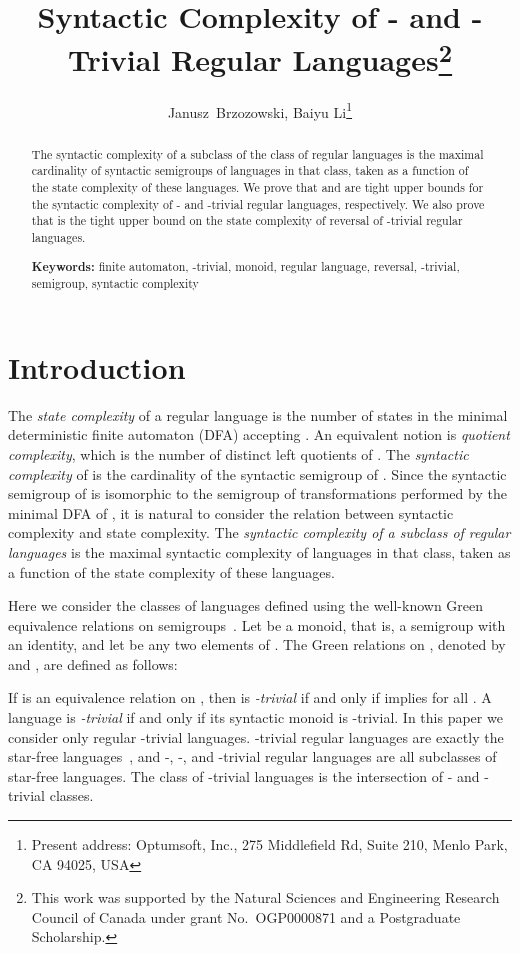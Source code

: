 \documentclass{llncs}
\title{Syntactic Complexity of - and -Trivial Regular Languages\thanks{This work was supported by the Natural Sciences and Engineering Research Council of Canada under grant No.~OGP0000871 and  a Postgraduate Scholarship.
}
}
\author{Janusz~Brzozowski, Baiyu Li\thanks{Present address: 
Optumsoft, Inc.,
275 Middlefield Rd, Suite 210, Menlo Park, CA 94025, USA}
}
\institute{David R. Cheriton School of Computer Science, University of Waterloo \\
Waterloo, ON, Canada N2L 3G1\\
\{{\tt \{brzozo, b5li\}@uwaterloo.ca} \}
}
\newcommand{\noin}{\noindent}
\begin{document}
\maketitle
\begin{abstract}
The syntactic complexity of a subclass of the class of regular languages is the maximal cardinality of syntactic semigroups of languages in that class, taken as a function of the state complexity  of these languages.
We prove that  and  are tight upper bounds for 
the syntactic complexity of - and -trivial regular languages, respectively. 
We also prove that  is the tight upper bound on the state complexity of reversal of -trivial regular languages. 
\bigskip

\noin
{\bf Keywords:}
finite automaton, -trivial, monoid, regular language, reversal, -trivial, semigroup, syntactic complexity 
\end{abstract}


\section{Introduction}\label{sec:intro}

The \emph{state complexity} of a regular language  is the number of states in the minimal deterministic finite automaton (DFA) accepting . An equivalent notion is \emph{quotient complexity}, which is the number of distinct left quotients of . 
The \emph{syntactic complexity} of  is the cardinality of the syntactic semigroup of . 
Since the syntactic semigroup of  is isomorphic to the semigroup of transformations performed by the minimal DFA of , it is natural to consider the relation between syntactic complexity and state complexity. The \emph{syntactic complexity of a subclass of regular languages} is the maximal syntactic complexity of languages in that class, taken as a function of the state complexity of these languages.

Here we consider the classes of languages defined using the well-known Green equivalence relations on semigroups~\cite{Pin97}. Let  be a monoid, that is, a semigroup with an identity, and let  be any two elements of . The Green relations on , denoted by  and , are defined as follows: 

If  is an equivalence relation on , then  is \emph{-trivial} if and only if  implies  for all . A language is \emph{-trivial} if and only if its syntactic monoid is -trivial. 
In this paper we consider only regular -trivial languages. 
-trivial regular languages are exactly the star-free languages~\cite{Pin97}, and -, -, and -trivial regular languages are all subclasses of star-free languages. 
The class of -trivial languages is the intersection of - and -trivial classes. 
\end{document}
